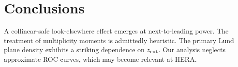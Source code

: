 \section{Conclusions}\label{sec:conclusions}

A collinear-safe look-elsewhere effect emerges at next-to-leading power.
The treatment of multiplicity moments is admittedly heuristic. The
primary Lund plane density exhibits a striking dependence on $z_{\rm
cut}$. Our analysis neglects approximate ROC curves, which may become
relevant at HERA.

